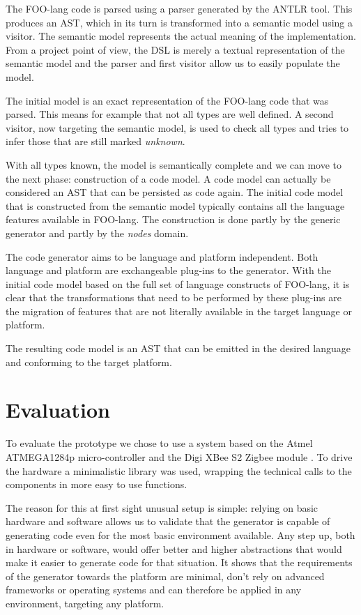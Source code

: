 \documentclass[conference]{IEEEtran}
\begin{document}
The FOO-lang code is parsed using a parser generated by the ANTLR tool. This
produces an AST, which in its turn is transformed into a semantic model using a
visitor. The semantic model represents the actual meaning of the
implementation. From a project point of view, the DSL is merely a textual
representation of the semantic model and the parser and first visitor allow us
to easily populate the model.

The initial model is an exact representation of the FOO-lang code that was
parsed. This means for example that not all types are well defined. A second
visitor, now targeting the semantic model, is used to check all types and tries
to infer those that are still marked \emph{unknown}.

With all types known, the model is semantically complete and we can move to the
next phase: construction of a code model. A code model can actually be
considered an AST that can be persisted as code again. The initial code model
that is constructed from the semantic model typically contains all the language
features available in FOO-lang. The construction is done partly by the generic
generator and partly by the \emph{nodes} domain.

The code generator aims to be language and platform independent. Both language
and platform are exchangeable plug-ins to the generator. With the initial code
model based on the full set of language constructs of FOO-lang, it is clear
that the transformations that need to be performed by these plug-ins are the
migration of features that are not literally available in the target language
or platform.

The resulting code model is an AST that can be emitted in the desired language
and conforming to the target platform.

\section{Evaluation}
\label{section:evaluation}

To evaluate the prototype we chose to use a system based on the Atmel
ATMEGA1284p micro-controller \cite{datasheet:atmega1284p} and the Digi XBee S2
Zigbee module \cite{manual:xbee}. To drive the hardware a minimalistic library
was used, wrapping the technical calls to the components in more easy to use
functions.

The reason for this at first sight unusual setup is simple: relying on basic
hardware and software allows us to validate that the generator is capable of
generating code even for the most basic environment available. Any step up,
both in hardware or software, would offer better and higher abstractions that
would make it easier to generate code for that situation. It shows that the
requirements of the generator towards the platform are minimal, don't rely on
advanced frameworks or operating systems and can therefore be applied in any
environment, targeting any platform.
\end{document}
